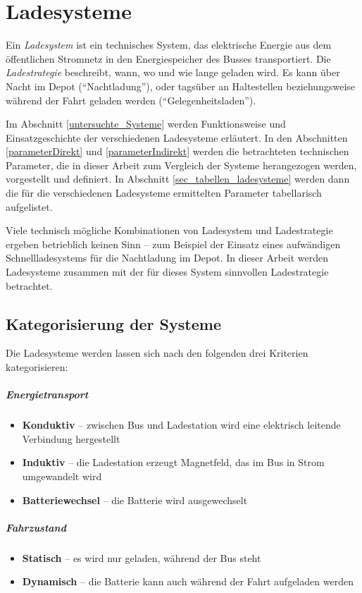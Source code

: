 \chapter{Ladesysteme}
Ein \emph{Ladesystem} ist ein technisches System, das elektrische Energie aus dem öffentlichen Stromnetz in den Energiespeicher des Busses transportiert. Die \emph{Ladestrategie} beschreibt, wann, wo und wie lange geladen wird. Es kann über Nacht im Depot ("`Nachtladung"'), oder tagsüber an Haltestellen beziehungsweise während der Fahrt geladen werden ("`Gelegenheitsladen"').

Im  Abschnitt \ref{untersuchte_Systeme} werden Funktionsweise und Einsatzgeschichte der verschiedenen Ladesysteme erläutert. In den Abschnitten \ref{parameterDirekt} und \ref{parameterIndirekt} werden die betrachteten technischen Parameter, die in dieser Arbeit zum Vergleich der Systeme herangezogen werden, vorgestellt und definiert. In Abschnitt \ref{sec_tabellen_ladesysteme} werden dann die für die verschiedenen Ladesysteme ermittelten Parameter tabellarisch aufgelistet. 

Viele technisch mögliche Kombinationen von Ladesystem und Ladestrategie ergeben betrieblich keinen Sinn – zum Beispiel der Einsatz eines aufwändigen Schnellladesystems für die Nachtladung im Depot. In dieser Arbeit werden Ladesysteme zusammen mit der für dieses System sinnvollen Ladestrategie betrachtet.

\section{Kategorisierung der Systeme}
Die Ladesysteme werden lassen sich nach den folgenden drei Kriterien kategorisieren:

\paragraph{Energietransport}
\begin{itemize}
	\item \textbf{Konduktiv} – zwischen Bus und Ladestation wird eine elektrisch leitende Verbindung hergestellt
	\item \textbf{Induktiv} – die Ladestation erzeugt Magnetfeld, das im Bus in Strom umgewandelt wird
	\item \textbf{Batteriewechsel} – die Batterie wird ausgewechselt
\end{itemize}

\paragraph{Fahrzustand}
\begin{itemize}
	\item \textbf{Statisch} – es wird nur geladen, während der Bus steht
	\item \textbf{Dynamisch} – die Batterie kann auch während der Fahrt aufgeladen werden
\end{itemize}


